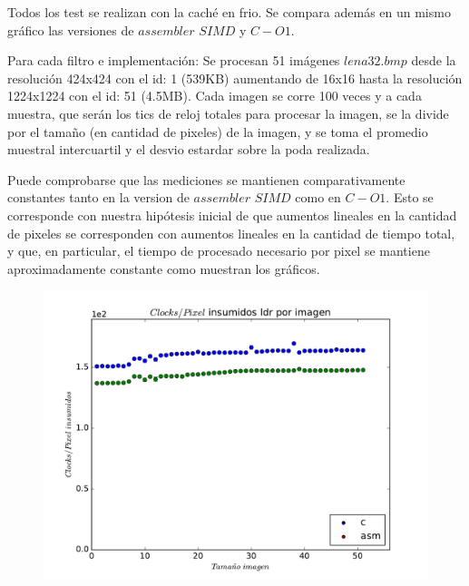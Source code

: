 Todos los test se realizan con la caché en frio. Se compara además en un mismo gráfico las versiones de $assembler$ $SIMD$ y $C-O1$.

Para cada filtro e implementación: Se procesan 51 imágenes $lena32.bmp$ desde la resolución 424x424 con el id: 1 (539KB) aumentando de 16x16 hasta la resolución 1224x1224 con el id: 51 (4.5MB). Cada imagen se corre 100 veces y a cada muestra, que serán los tics de reloj totales para procesar la imagen, se la divide por el tamaño (en cantidad de pixeles) de la imagen, y se toma el promedio muestral intercuartil y el desvio estardar sobre la poda realizada.

Puede comprobarse que las mediciones se mantienen comparativamente constantes tanto en la version de $assembler$ $SIMD$ como en $C-O1$.
Esto se corresponde con nuestra hipótesis inicial de que aumentos lineales en la cantidad de pixeles se corresponden con aumentos lineales en la cantidad de tiempo total, y que, en particular, el tiempo de procesado necesario por pixel se mantiene aproximadamente constante como muestran los gráficos.


\begin{figure}[h]
  \begin{center}
	\includegraphics[scale=0.5]{ldrall.pdf}
  \end{center}
\end{figure}


